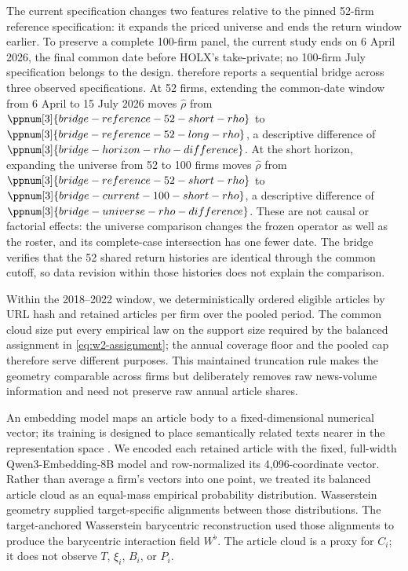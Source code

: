 The current specification changes two features relative to the pinned
52-firm reference specification: it expands the priced universe and ends the
return window earlier.
To preserve a complete 100-firm panel, the current study ends on 6 April 2026,
the final common date before HOLX's take-private; no 100-firm July specification
belongs to the design.
 therefore reports a sequential bridge
across three observed specifications.
At 52 firms, extending the common-date window from 6 April to 15 July 2026
moves $\hat\rho$ from
$\ppnum[3]{bridge-reference-52-short-rho}$ to
$\ppnum[3]{bridge-reference-52-long-rho}$, a descriptive difference of
$\ppnum[3]{bridge-horizon-rho-difference}$.
At the short horizon, expanding the universe from 52 to 100 firms moves
$\hat\rho$ from $\ppnum[3]{bridge-reference-52-short-rho}$ to
$\ppnum[3]{bridge-current-100-short-rho}$, a descriptive difference of
$\ppnum[3]{bridge-universe-rho-difference}$.
These are not causal or factorial effects: the universe comparison changes the
frozen operator as well as the roster, and its complete-case intersection has
one fewer date.
The bridge verifies that the 52 shared return histories are identical through
the common cutoff, so data revision within those histories does not explain
the comparison.



Within the 2018--2022 window, we deterministically ordered eligible articles by
URL hash and retained
 articles per firm over the pooled period.
The common cloud size put every empirical law on the support size required by
the balanced assignment in \eqref{eq:w2-assignment}; the annual coverage floor
and the pooled cap therefore serve different purposes.
This maintained truncation rule makes the geometry comparable across firms but
deliberately removes raw news-volume information and need not preserve raw
annual article shares.

An embedding model maps an article body to a fixed-dimensional numerical vector;
its training is designed to place semantically related texts nearer in the
representation space \citep{qwen3_embedding_2025}.
We encoded each retained article with the fixed, full-width
Qwen3-Embedding-8B model and row-normalized its 4,096-coordinate vector.
Rather than average a firm's vectors into one point, we treated its balanced
article cloud as an equal-mass empirical probability distribution.
Wasserstein geometry supplied target-specific alignments between those
distributions.
The target-anchored Wasserstein barycentric reconstruction used those alignments
to produce the barycentric interaction field $W^\flat$.
The article cloud is a proxy for $C_i$; it does not observe $T$, $\xi_i$, $B_i$,
or $P_i$.

